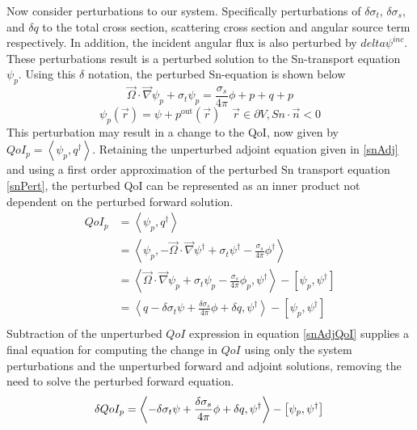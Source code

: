 \documentclass{article}
\newcommand{\vr}{\vec{r}}
\newcommand{\vO}{\vec{\Omega}}
\newcommand{\bra}{\left\langle}
\newcommand{\ket}{\right\rangle}
\newcommand{\sbra}{\left[}
\newcommand{\sket}{\right]}
\newcommand{\vgrad}{\vec{\nabla}}
\newcommand{\bound}{\partial V}
\newcommand{\sigt}{\sigma_t}
\newcommand{\sigs}{\sigma_s}
\newcommand{\scalSource}{q}
\newcommand{\angResp}{q^\dag}
\newcommand{\qoi}{QoI}
\begin{document}
Now consider perturbations to our system. Specifically perturbations of $\delta \sigt$, $\delta \sigs$, and $\delta q$ to the total cross section, scattering cross section and angular source term respectively. In addition, the incident angular flux is also perturbed by $delta \psi^{inc}$. These perturbations result is a perturbed solution to the Sn-transport equation $\psi_p$. Using this $\delta$ notation, the perturbed Sn-equation is shown below
\begin{equation}
\label{snFwdPert}
\vO \cdot \vgrad \psi_p + \sigt \psi_p = \frac{\sigs}{4 \pi} \phi+p + q+p
\end{equation}
\begin{equation}
\psi_p(\vr) = \psi+p^{\text{out}}(\vr) \quad \vr \in \bound , Sn \cdot \vec{n} < 0
\end{equation}
This perturbation may result in a change to the QoI, now given by $\qoi_p=\bra \psi_p , \angResp \ket$. Retaining the unperturbed adjoint equation given in \ref{snAdj} and using a first order approximation of the perturbed Sn transport equation \ref{snPert}, the perturbed QoI can be represented as an inner product not dependent on the perturbed forward solution.
\begin{equation}
\label{snSens}
\begin{split}
QoI_p &=\bra \psi_p , \angResp \ket \\
&=\bra \psi_p , - \vO \cdot \vgrad \psi^\dag + \sigt \psi^\dag - \frac{\sigs}{4 \pi} \phi^\dag  \ket \\
&= \bra  \vO \cdot \vgrad \psi_p + \sigt \psi_p - \frac{\sigs}{4 \pi} \phi_p , \psi^\dag  \ket - \sbra \psi_p, \psi^\dag \sket\\
&= \bra  \scalSource - \delta \sigt \psi + \frac{\delta\sigs}{4 \pi} \phi + \delta \scalSource , \psi^\dag  \ket - \sbra \psi_p, \psi^\dag \sket\\
\end{split}
\end{equation}
Subtraction of the unperturbed $QoI$ expression in equation \ref{snAdjQoI} supplies a final equation for computing the change in $QoI$ using only the system perturbations and the unperturbed forward and adjoint solutions, removing the need to solve the perturbed forward equation.
\begin{equation}
\delta QoI_p = \bra - \delta \sigt \psi + \frac{\delta\sigs}{4 \pi} \phi + \delta \scalSource , \psi^\dag  \ket - \sbra \psi_p, \psi^\dag \sket\\
\end{equation}
\end{document}
